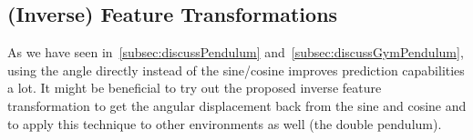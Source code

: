 	\subsection{(Inverse) Feature Transformations}
		As we have seen in~\ref{subsec:discussPendulum} and~\autoref{subsec:discussGymPendulum}, using the angle directly instead of the sine/cosine improves prediction capabilities a lot. It might be beneficial to try out the proposed inverse feature transformation to get the angular displacement back from the sine and cosine and to apply this technique to other environments as well (\eg the double pendulum).
